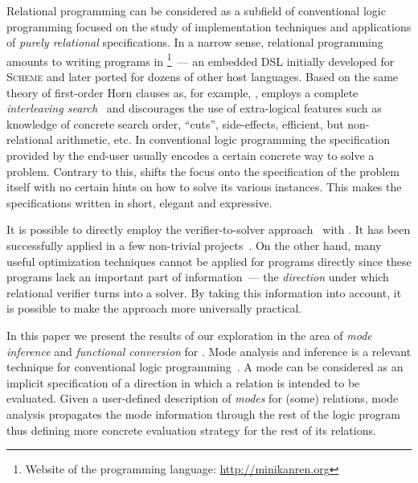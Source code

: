 Relational programming can be considered as a subfield of conventional logic programming focused on the study of implementation techniques and applications of \emph{purely relational} specifications.
In a narrow sense, relational programming amounts to writing programs in \mk\footnote{Website of the \mk programming language: \url{http://minikanren.org}}~--- an embedded DSL initially developed for \textsc{Scheme} and later ported for dozens of other host languages.
Based on the same theory of first-order Horn clauses as, for example, \prolog, \mk employs a complete \emph{interleaving search}~\cite{kiselyov2005backtracking, rozplokhas2020certified} and discourages the use of extra-logical features such as knowledge of concrete search order, ``cuts'', side-effects, efficient, but non-relational arithmetic, etc.
In conventional logic programming the specification provided by the end-user usually encodes a certain concrete way to solve a problem.
Contrary to this, \mk shifts the focus onto the specification of the problem itself with no certain hints on how to solve its various instances.
This makes the specifications written in \mk short, elegant and expressive.

It is possible to directly employ the verifier-to-solver approach~\cite{byrd2017unified,kosarev2020relational} with \mk.
It has been successfully applied in a few non-trivial projects~\cite{kosarev2022declarative,lozov2023relational}.
On the other hand, many useful optimization techniques cannot be applied for \mk programs directly since these programs lack an important part of information~--- the \emph{direction} under which relational verifier turns into a solver.
By taking this information into account, it is possible to make the approach more universally practical.

In this paper we present the results of our exploration in the area of \emph{mode inference} and \emph{functional conversion} for \mk.
Mode analysis and inference is a relevant technique for conventional logic programming~\cite{debray1988automatic,somogyi1987system,overton2002constraint}.
A mode can be considered as an implicit specification of a direction in which a relation is intended to be evaluated.
Given a user-defined description of \emph{modes} for (some) relations, mode analysis propagates the mode information through the rest of the logic program thus defining more concrete evaluation strategy for the rest of its relations.

